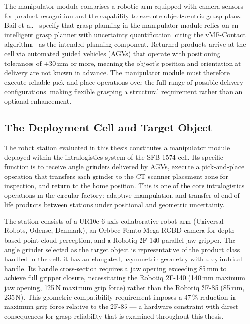 \documentclass[12pt, a4paper]{report}
\begin{document}
The manipulator module comprises a robotic arm equipped with camera sensors for product recognition and the capability to execute object-centric grasp plans. Bail et al.~\cite{bail2025circular} specify that grasp planning in the manipulator module relies on an intelligent grasp planner with uncertainty quantification, citing the vMF-Contact algorithm~\cite{shi2025} as the intended planning component. Returned products arrive at the cell via automated guided vehicles (AGVs) that operate with positioning tolerances of $\pm$30\,mm or more, meaning the object's position and orientation at delivery are not known in advance. The manipulator module must therefore execute reliable pick-and-place operations over the full range of possible delivery configurations, making flexible grasping a structural requirement rather than an optional enhancement.

\subsection{The Deployment Cell and Target Object}
\label{sec:background-deployment-cell}

The robot station evaluated in this thesis constitutes a manipulator module deployed within the intralogistics system of the SFB-1574 cell. Its specific function is to receive angle grinders delivered by AGVs, execute a pick-and-place operation that transfers each grinder to the CT scanner placement zone for inspection, and return to the home position. This is one of the core intralogistics operations in the circular factory: adaptive manipulation and transfer of end-of-life products between stations under positional and geometric uncertainty.

The station consists of a UR10e 6-axis collaborative robot arm (Universal Robots, Odense, Denmark), an Orbbec Femto Mega RGBD camera for depth-based point-cloud perception, and a Robotiq 2F-140 parallel-jaw gripper. The angle grinder selected as the target object is representative of the product class handled in the cell: it has an elongated, asymmetric geometry with a cylindrical handle. Its handle cross-section requires a jaw opening exceeding 85\,mm to achieve full gripper closure, necessitating the Robotiq 2F-140 (140\,mm maximum jaw opening, 125\,N maximum grip force) rather than the Robotiq 2F-85 (85\,mm, 235\,N). This geometric compatibility requirement imposes a 47\,\% reduction in maximum grip force relative to the 2F-85 --- a hardware constraint with direct consequences for grasp reliability that is examined throughout this thesis.
\end{document}
